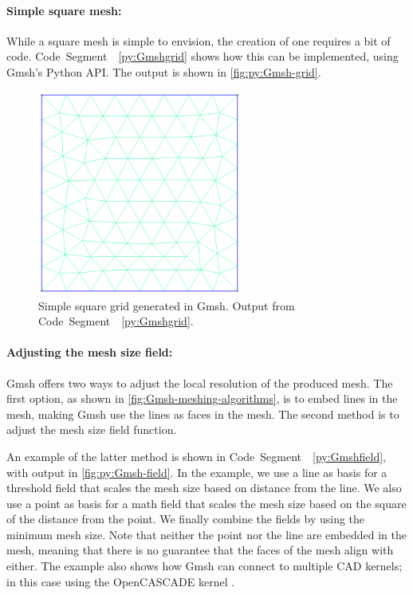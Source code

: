 \paragraph{Simple square mesh:}
While a square mesh is simple to envision, the creation of one requires a bit of code. Code~Segment~~\ref{py:Gmshgrid} shows how this can be implemented, using Gmsh's Python API. The output is shown in \autoref{fig:py:Gmsh-grid}.


\begin{figure}[tp]
    \centering
    \includegraphics[width=0.6\textwidth]{report/Images/Software/Gmsh examples/gmsh_square_mesh.png}
    \caption[Simple square grid generated in Gmsh]{Simple square grid generated in Gmsh. Output from Code~Segment~~\ref{py:Gmshgrid}.}
    \label{fig:py:Gmsh-grid}
\end{figure}


\paragraph{Adjusting the mesh size field:}
Gmsh offers two ways to adjust the local resolution of the produced mesh. The first option, as shown in \autoref{fig:Gmsh-meshing-algorithms}, is to embed lines in the mesh, making Gmsh use the lines as faces in the mesh. The second method is to adjust the mesh size field function.

An example of the latter method is shown in Code~Segment~~\ref{py:Gmshfield}, with output in \autoref{fig:py:Gmsh-field}. In the example, we use a line as basis for a threshold field that scales the mesh size based on distance from the line. We also use a point as basis for a math field that scales the mesh size based on the square of the distance from the point. We finally combine the fields by using the minimum mesh size. Note that neither the point nor the line are embedded in the mesh, meaning that there is no guarantee that the faces of the mesh align with either. The example also shows how Gmsh can connect to multiple CAD kernels; in this case using the OpenCASCADE kernel \cite{Gmsh_reference}.

